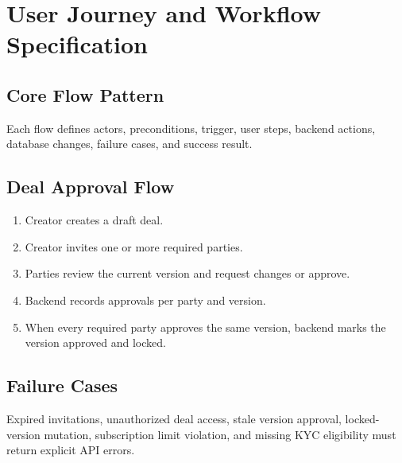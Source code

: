 \chapter{User Journey and Workflow Specification}
\section{Core Flow Pattern}
Each flow defines actors, preconditions, trigger, user steps, backend actions, database changes, failure cases, and success result.
\section{Deal Approval Flow}
\begin{enumerate}
  \item Creator creates a draft deal.
  \item Creator invites one or more required parties.
  \item Parties review the current version and request changes or approve.
  \item Backend records approvals per party and version.
  \item When every required party approves the same version, backend marks the version approved and locked.
\end{enumerate}
\section{Failure Cases}
Expired invitations, unauthorized deal access, stale version approval, locked-version mutation, subscription limit violation, and missing KYC eligibility must return explicit API errors.

